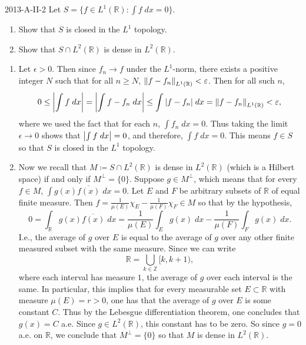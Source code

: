 \documentclass{article}
\begin{document}
	\begin{prb}{2013-A-II-2}
		Let $S = \{f \in L^1(\mathbb{R}): \int f\;dx = 0\}$. \vspace{-0.25cm}
		\begin{enumerate}[itemsep =-2pt,label = (\arabic{*})]
			\item Show that $S$ is closed in the $L^1$ topology. 
			\item Show that $S \cap L^2(\mathbb{R})$ is dense in $L^2(\mathbb{R})$. 	
		\end{enumerate}
	\end{prb}
	\vspace{-0.25cm}
	\begin{enumerate}[itemsep =-2pt,label = (\arabic{*})]
		\item Let $\epsilon > 0$. Then since $f_{n} \to f$ under the $L^{1}$-norm, there exists a positive integer $N$ such that for all $n \geq N$, $\left\Vert f - f_{n} \right\Vert_{L^{1}(\mathbb{R})} < \varepsilon$. Then for all such $n$, 
		\begin{equation*}
			0 \leq \left| \int f\;dx \right| = \left| \int f - f_{n}\;dx \right| \leq \int |f - f_{n}|\;dx = \left\Vert f - f_{n} \right\Vert_{L^{1}(\mathbb{R})} < \varepsilon, 
		\end{equation*}
		where we used the fact that for each $n$, $\int f_{n}\;dx = 0$. Thus taking the limit $\epsilon \to 0$ shows that $\left| \int f\;dx \right| = 0$, and therefore, $\int f\;dx = 0$. This means $f \in S$ so that $S$ is closed in the $L^1$ topology. 
		\item Now we recall that $M \coloneqq S \cap L^2(\mathbb{R})$ is dense in $L^2(\mathbb{R})$ (which is a Hilbert space) if and only if $M^{\perp} = \{0\}$. Suppose $g \in M^{\perp}$, which means that for every $f \in M$, $\int g(x)\overline{f(x)}\;dx = 0$. Let $E$ and $F$ be arbitrary subsets of $\mathbb{R}$ of equal finite measure. Then $f = \frac{1}{\mu(E)}\chi_{E} - \frac{1}{\mu(F)}\chi_{F} \in M$ so that by the hypothesis, 
		\begin{equation*}
			0 = \int_{\mathbb{R}}g(x)\overline{f(x)}\;dx = \frac{1}{\mu(E)}\int_{E}g(x)\;dx - \frac{1}{\mu(F)}\int_{F}g(x)\;dx. 
		\end{equation*}
		I.e., the average of $g$ over $E$ is equal to the average of $g$ over any other finite measured subset with the same measure. Since we can write 
		\begin{equation*}
			\mathbb{R} = \bigcup_{k \in \mathbb{Z}}[k, k + 1), 
		\end{equation*}
		where each interval has measure $1$, the average of $g$ over each interval is the same. In particular, this implies that for every measurable set $E \subset \mathbb{R}$ with measure $\mu(E) = r > 0$, one has that the average of $g$ over $E$ is some constant $C$. Thus by the Lebesgue differentiation theorem, one concludes that $g(x) = C$ a.e. Since $g \in L^2(\mathbb{R})$, this constant has to be zero. So since $g = 0$ a.e. on $\mathbb{R}$, we conclude that $M^{\perp} = \{0\}$ so that $M$ is dense in $L^2(\mathbb{R})$. 
		

\end{enumerate}
\end{document}
